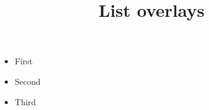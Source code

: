 \documentclass{ltx-talk}
\title{List overlays}
\begin{document}
\begin{frame}
  \begin{itemize}[<+->]
    \item First
    \item Second
    \item Third
  \end{itemize}
\end{frame}
\end{document}
